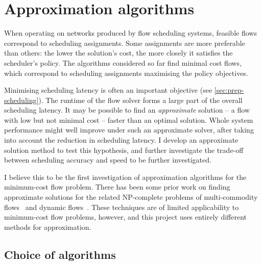 
\section{Approximation algorithms} \label{sec:impl-approx}

When operating on networks produced by flow scheduling systems, feasible flows correspond to scheduling assignments. Some assignments are more preferable than others: the lower the solution's cost, the more closely it satisfies the scheduler's policy. The algorithms considered so far find minimal cost flows, which correspond to scheduling assignments maximising the policy objectives.

Minimising scheduling latency is often an important objective (see \cref{sec:prep-scheduling}). The runtime of the flow solver forms a large part of the overall scheduling latency. It may be possible to find an \emph{approximate} solution -- a flow with low but not minimal cost -- faster than an optimal solution. Whole system performance might well improve under such an approximate solver, after taking into account the reduction in scheduling latency. I develop an approximate solution method to test this hypothesis, and further investigate the trade-off between scheduling accuracy and speed to be further investigated.

I believe this to be the first investigation of approximation algorithms for the minimum-cost flow problem. There has been some prior work on finding approximate solutions for the related NP-complete problems of multi-commodity flows~\cite{Garg:2007} and dynamic flows~\cite{Hoppe:1994}. These techniques are of limited applicability to minimum-cost flow problems\footnotemark, however, and this project uses entirely different methods for approximation.

\subsection{Choice of algorithms} \label{sec:impl-approx-choice}

